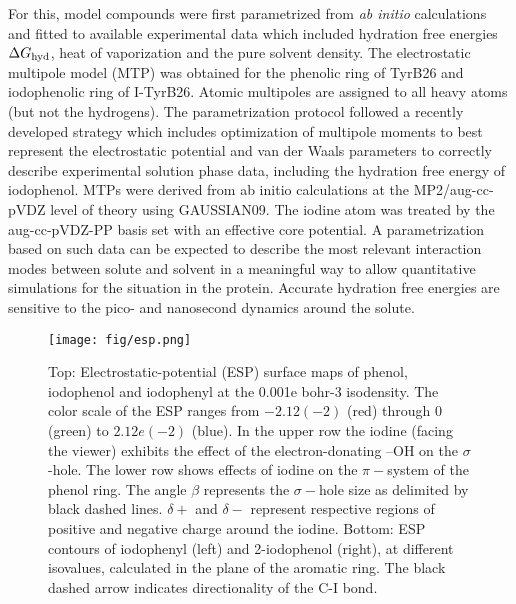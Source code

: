 \documentclass[journal=jacsat,manuscript=article]{achemso}
\begin{document}
\noindent
For this, model compounds were first parametrized from {\it ab initio}
calculations and fitted to available experimental data which included
hydration free energies $\Delta G_{\rm hyd}$, heat of vaporization and
the pure solvent density. The electrostatic multipole model
(MTP)\cite{bereau2013} was obtained for the phenolic ring of TyrB26
and iodophenolic ring of I-TyrB26. Atomic multipoles are assigned to
all heavy atoms (but not the hydrogens). The parametrization protocol
followed a recently developed strategy which includes optimization of
multipole moments to best represent the electrostatic potential and
van der Waals parameters to correctly describe experimental solution
phase data, including the hydration free energy of
iodophenol.\cite{toolkit:2016,toolkit:2017} MTPs were derived from ab
initio calculations at the MP2/aug-cc-pVDZ level of theory using
GAUSSIAN09. The iodine atom was treated by the aug-cc-pVDZ-PP basis
set with an effective core potential. A parametrization based on such
data can be expected to describe the most relevant interaction modes
between solute and solvent in a meaningful way to allow quantitative
simulations for the situation in the protein. Accurate hydration free
energies are sensitive to the pico- and nanosecond dynamics around the
solute.

\begin{figure}[h]
\centering
\texttt{[image: fig/esp.png]}
\caption{Top: Electrostatic-potential (ESP) surface maps of phenol,
  iodophenol and iodophenyl at the 0.001e bohr-3 isodensity. The color
  scale of the ESP ranges from $-2.12(-2)$ (red) through 0 (green) to
  $2.12 e(-2)$ (blue). In the upper row the iodine (facing the viewer)
  exhibits the effect of the electron-donating –OH on the
  $\sigma$-hole. The lower row shows effects of iodine on the
  $\pi-$system of the phenol ring.  The angle $\beta$ represents the
  $\sigma-$hole size as delimited by black dashed lines. $\delta+$ and
  $\delta-$ represent respective regions of positive and negative
  charge around the iodine. Bottom: ESP contours of iodophenyl (left)
  and 2-iodophenol (right), at different isovalues, calculated in the
  plane of the aromatic ring. The black dashed arrow indicates
  directionality of the C-I bond. }
\label{fig:esp}
\end{figure}
\end{document}
